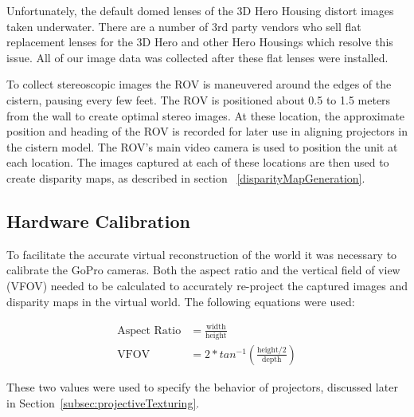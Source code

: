 \documentclass[a4paper,twoside]{article}
\begin{document}
Unfortunately, the default domed lenses of the 3D Hero Housing distort images taken underwater.  
There are a number of 3rd party vendors who sell flat replacement lenses for the 3D Hero and other Hero Housings which resolve this issue.  
All of our image data was collected after these flat lenses were installed.

To collect stereoscopic images the ROV is maneuvered around the edges of the cistern, pausing every few feet.  
The ROV is positioned about 0.5 to 1.5 meters from the wall to create optimal stereo images.  
At these location, the approximate position and heading of the ROV is recorded for later use in aligning projectors in the cistern model.
The ROV's main video camera is used to position the unit at each location.  
The images captured at each of these locations are then used to create disparity maps, as described in section ~\ref{disparityMapGeneration}.




\subsection{Hardware Calibration}
To facilitate the accurate virtual reconstruction of the world it was necessary to calibrate the GoPro cameras.
Both the aspect ratio and the vertical field of view (VFOV) needed to be calculated to accurately re-project the captured images and disparity maps in the virtual world.  
The following equations were used:

\begin{align}
\text{Aspect Ratio} &= \frac{\text{width}}{\text{height}} \\
\text{VFOV} &= 2 * tan^{-1}(\frac{\text{height}/2}{\text{depth}})
\end{align}


These two values were used to specify the behavior of projectors, discussed later in Section~\ref{subsec:projectiveTexturing}.

\end{document}
